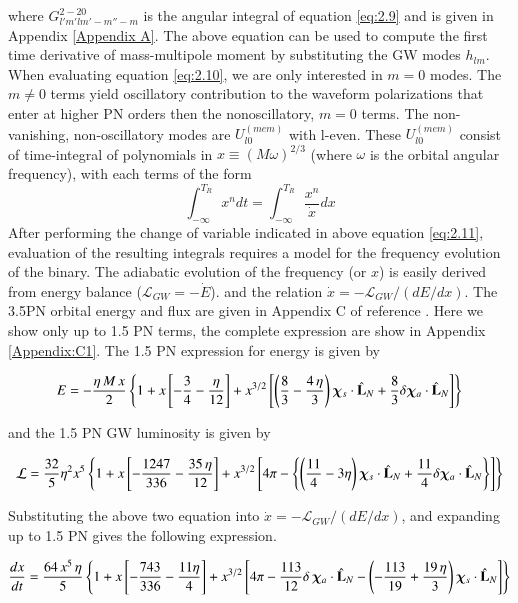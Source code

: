 \documentclass[twocolumn,showpacs,aps,prd,nobibnotes,floatfix]{revtex4-1}
\begin{document}
where $G^{2-20}_{l'm'lm'-m''-m}$ is the angular integral of equation \ref{eq:2.9} and is given in Appendix \ref{Appendix A}. The above equation can be used to compute the first time derivative of mass-multipole moment by substituting the GW modes $h_{lm}$. When evaluating equation \ref{eq:2.10}, we are only interested in $m=0$ modes. The $m\neq0$ terms yield oscillatory contribution to the waveform polarizations that enter at higher PN orders then the nonoscillatory, $m=0$ terms. The non-vanishing, non-oscillatory modes are $U^{(mem)}_{l0}$ with l-even. These $U^{(mem)}_{l0}$ consist of time-integral of polynomials in $x\equiv(M\omega)^{2/3}$ (where $\omega$ is the orbital angular frequency), with each terms of the form
\begin{equation}\label{eq:2.11}
\int_{-\infty}^{T_{R}} x^{n}dt=\int_{-\infty}^{T_{R}}\frac{x^{n}}{\dot{x}}dx
\end{equation}
After performing the change of variable indicated in above equation \ref{eq:2.11}, evaluation of the resulting integrals requires a model for the frequency evolution of the binary. The adiabatic evolution of the frequency (or $x$) is easily derived from energy balance ($\mathcal{L}_{GW}=-\dot{E}$). and the relation $\dot{x}=-\mathcal{L}_{GW}/(dE/dx)$. The 3.5PN orbital energy and flux are given in Appendix C of reference \cite{Arun2009}. Here we show only up to 1.5 PN terms, the complete expression are show in Appendix \ref{Appendix:C1}. The 1.5 PN expression for energy is given by 
\begin{widetext}
	\begin{align}\label{eq:E}
	E&=-\frac{\eta \, M \, x}{2}\left\{1 + x \left[-\frac{3}{4}-\frac{\eta}{12}\right] + x^{3/2}\left[\left(\frac{8}{3} - \frac{4 \, \eta}{3}\right)\bm{\chi}_s \cdot \hat{\mathbf{L}}_N + \frac{8}{3}\delta\bm{\chi}_a \cdot \hat{\mathbf{L}}_N\right]\right\} \nonumber \\
	\end{align}

and the 1.5 PN GW luminosity is given by

\begin{align}\label{eq:F}
\mathcal{L} &=\frac{32}{5}\eta^2x^5\left\{1 + x\left[-\frac{1247}{336}-\frac{35\,\eta}{12}\right] + x^{3/2}\left[4\pi-\left\{\left(\frac{11}{4}-3\eta\right)\bm{\chi}_s \cdot \hat{\mathbf{L}}_N +\frac{11}{4}\delta\bm{\chi}_a \cdot \hat{\mathbf{L}}_N\right\}\right]\right\}\nonumber\\
\end{align}


Substituting the above two equation into $\dot{x}=-\mathcal{L}_{GW}/(dE/dx)$, and expanding up to 1.5 PN gives the following expression.

\begin{align}\label{eq:2.14}
\frac{dx}{dt} & = \frac{64\, x^5  \, \eta}{5} \left\{1 + x \left[-\frac{743}{336}-\frac{11 \eta }{4} \right] 
+ x^{3/2} \left[4 \pi-\frac{113}{12}\delta \, \bm{\chi}_a \cdot \hat{\mathbf{L}}_N- \left(-\frac{113}{19} + \frac{19 \, \eta}{3}  \right)\bm{\chi}_s \cdot \hat{\mathbf{L}}_N \right] \right\} \nonumber \\ 
\end{align}
\end{widetext}
\end{document}
